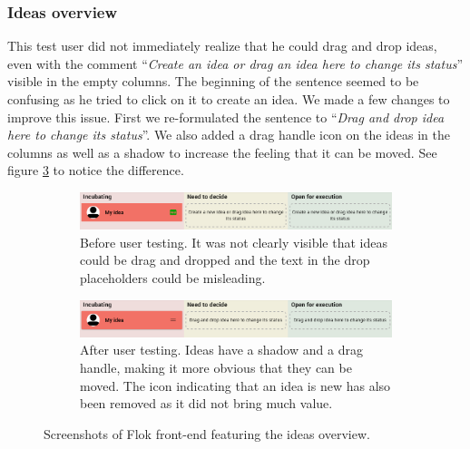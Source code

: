 \documentclass[a4paper,12pt, oneside]{article}
\begin{document}



\subsubsection*{Ideas overview}
This test user did not immediately realize that he could drag and drop ideas, even with the comment “\emph{Create an idea or drag an idea here to change its status}” visible in the empty columns.
The beginning of the sentence seemed to be confusing as he tried to click on it to create an idea.
We made a few changes to improve this issue.
First we re-formulated the sentence to “\emph{Drag and drop idea here to change its status}”.
We also added a drag handle icon on the ideas in the columns as well as a shadow to increase the feeling that it can be moved.
See figure \ref{fig.tests.ideasOverview} to notice the difference.

\begin{figure}[!htb]
    \begin{subfigure}[t]{\textwidth}
        \includegraphics[width=\textwidth]{images/user_tests/ideasOverview_before.png}
        \caption{Before user testing. It was not clearly visible that ideas could be drag and dropped and the text in the drop placeholders could be misleading.}
        \label{fig.tests.ideasOverview.before}
    \end{subfigure}
    \begin{subfigure}[t]{\textwidth}
        \includegraphics[width=\textwidth]{images/user_tests/ideasOverview_after.png}
        \caption{After user testing. Ideas have a shadow and a drag handle, making it more obvious that they can be moved. The icon indicating that an idea is new has also been removed as it did not bring much value.}
        \label{fig.tests.ideasOverview.after}
    \end{subfigure}
    \caption{Screenshots of Flok front-end featuring the ideas overview.}
    \label{fig.tests.ideasOverview}
\end{figure}
\end{document}
